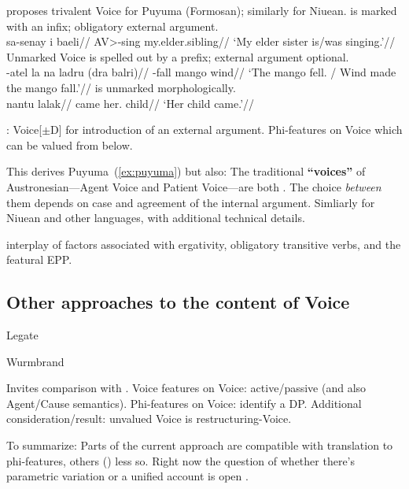 \pex\label{ex:puyuma}\cite{nie17} proposes trivalent Voice for Puyuma (Formosan); similarly for Niuean.
	\a {\vd} is marked with an infix; obligatory external argument.\\
		\begingl
		\gla sa-senay i baeli//
		\glb {<}AV>-sing  my.elder.sibling//
		\glft `My elder sister is/was singing.'//
	\endgl
	\a Unmarked Voice is spelled out by a prefix; external argument optional.\\
		\begingl
		\gla {}-atel la na ladru (dra balri)//
		\glb {}-fall   mango  wind//
		\glft `The mango fell. / Wind made the mango fall.'//
	\endgl
	\a {\vz} is unmarked morphologically.\\
		\begingl
		\gla {} nantu lalak//
		\glb came her. child//
		\glft `Her child came.'//
	\endgl
\xe


\pex \cite{nie17}:
	\a Voice{[}$\pm$D] for introduction of an external argument.
	\a Phi-features on Voice which can be valued from below.
\xe

\pex This derives Puyuma~(\ref{ex:puyuma}) but also:
	\a The traditional \textbf{``voices''} of Austronesian---Agent Voice and Patient Voice---are both {\vd}. The choice \emph{between} them depends on case and agreement of the internal argument.
	\a Simliarly for Niuean and other languages, with additional technical details.
\xe


interplay of factors associated with ergativity, obligatory transitive verbs, and the featural EPP.

	\subsection{Other approaches to the content of Voice} \label{i:agree:other}
Legate

Wurmbrand

\pex Invites comparison with \cite{wurmbrandshimamura17}.
	\a Voice features on Voice: active/passive (and also Agent/Cause semantics). %
	\a Phi-features on Voice: identify a DP.
	\a Additional consideration/result: unvalued Voice is restructuring-Voice.
\xe

\pex To summarize:
	\a Parts of the current approach are compatible with translation to phi-features, others (\vz) less so.
	\a Right now the question of whether there's parametric variation or a unified account is open \citep[191ff12]{wurmbrandshimamura17}.
\xe


